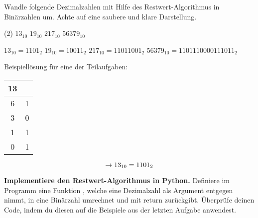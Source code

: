 \begin{question}
	Wandle folgende Dezimalzahlen mit Hilfe des Restwert-Algorithmus in Binärzahlen um. Achte auf eine saubere und klare Darstellung.
 	\begin{tasks}(2)
		\task $\num{13}_{10}$
		\task $\num{19}_{10}$
		\task $\num{217}_{10}$
		\task $\num{56379}_{10}$
	\end{tasks}
\end{question}
\begin{solution}
	\begin{tasks}
		\task $\num{13}_{10} = 1101_2$
		\task $\num{19}_{10} = 10011_2$
		\task $\num{217}_{10} = 11011001_2$
		\task $\num{56379}_{10} = 1101110000111011_2$
	\end{tasks}

	Beispiellösung für eine der Teilaufgaben:
	\begin{table}[H]
		\centering
		\renewcommand{\arraystretch}{1.5}
		\begin{tabular}{|c|c|}
		\hline
		\textbf{13} & \\ \hline
		6 & 1 \\ \hline
		3 & 0 \\ \hline
		1 & 1 \\ \hline
		0 & 1 \\ \hline
		\end{tabular}
	\end{table}
	$$\rightarrow 13_{10} = 1101_2$$

\end{solution}

\newpage

\cprotEnv\begin{question}
	\textbf{Implementiere den Restwert-Algorithmus in Python.} Definiere im Programm eine Funktion , welche eine Dezimalzahl  als Argument entgegen nimmt, in eine Binärzahl umrechnet und mit return zurückgibt. Überprüfe deinen Code, indem du diesen auf die Beispiele aus der letzten Aufgabe anwendest.
\end{question}
\begin{solution}
\end{solution}


\newpage

